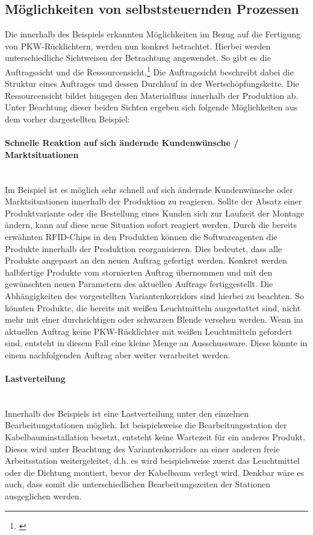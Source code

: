 \subsection{Möglichkeiten von selbststeuernden Prozessen}
\label{sec:Moeglichkeiten}

Die innerhalb des Beispiels erkannten Möglichkeiten im Bezug auf die Fertigung
von PKW-Rücklichtern, werden nun konkret betrachtet. Hierbei werden
unterschiedliche Sichtweisen der Betrachtung angewendet. So gibt es die
Auftragssicht und die Ressourcensicht.\footnote{\citet[S.~234]{arnold2008}}
Die Auftragssicht beschreibt dabei die Struktur eines Auftrages und dessen Durchlauf in der Wertschöpfungskette. Die
Ressourcensicht bildet hingegen den Materialfluss innerhalb der Produktion ab.
Unter Beachtung dieser beiden Sichten ergeben sich folgende Möglichkeiten aus
dem vorher dargestellten Beispiel:

\paragraph{Schnelle Reaktion auf sich ändernde Kundenwünsche /
Marktsituationen} \hfill \\
Im Beispiel ist es möglich sehr schnell auf sich ändernde Kundenwünsche oder
Marktsituationen innerhalb der Produktion zu reagieren. Sollte der Absatz einer
Produktvariante oder die Bestellung eines Kunden sich zur Laufzeit der Montage
ändern, kann auf diese neue Situation sofort reagiert werden. Durch die bereits
erwähnten RFID-Chips in den Produkten können die Softwareagenten die Produkte
innerhalb der Produktion reorganisieren. Dies bedeutet, dass alle Produkte
angepasst an den neuen Auftrag gefertigt werden. Konkret werden halbfertige
Produkte vom stornierten Auftrag übernommen und mit den gewünschten neuen
Parametern des aktuellen Auftrags fertiggestellt. Die Abhängigkeiten des
vorgestellten Variantenkorridors sind hierbei zu beachten. So könnten Produkte,
die bereits mit weißen Leuchtmitteln ausgestattet sind, nicht mehr mit einer
durchsichtigen oder schwarzen Blende versehen werden. Wenn im aktuellen Auftrag
keine PKW-Rücklichter mit weißen Leuchtmitteln gefordert sind, entsteht in
diesem Fall eine kleine Menge an Ausschussware. Diese könnte in einem
nachfolgenden Auftrag aber weiter verarbeitet werden.

\paragraph{Lastverteilung} \hfill \\
Innerhalb des Beispiels ist eine Lastverteilung unter den einzelnen
Bearbeitungstationen möglich. Ist beispielsweise die Bearbeitungsstation der
Kabelbauminstallation besetzt, entsteht keine Wartezeit für ein anderes Produkt.
Dieses wird unter Beachtung des Variantenkorridors an einer anderen freie
Arbeitsstation weitergeleitet, d.h. es wird beispielsweise zuerst das
Leuchtmittel oder die Dichtung montiert, bevor der Kabelbaum verlegt wird.
Denkbar wäre es auch, dass somit die unterschiedlichen Bearbeitungszeiten der
Stationen ausgeglichen werden.

